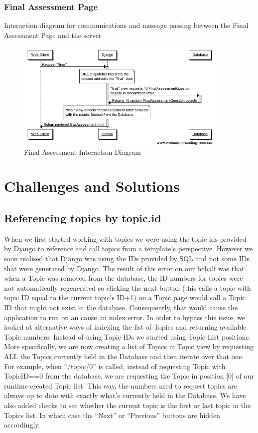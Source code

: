 \documentclass{l3proj}
\begin{document}
\subsubsection{Final Assessment Page}
Interaction diagram for communications and message passing between the Final Assessment Page and the server
\begin{figure}[!htb]
\caption{Final Assessment Interaction Diagram}
 \centering
\includegraphics[width=0.9\textwidth]{images/finalAssessmentInteractionDiagram.png}
\end{figure}
\section{Challenges and Solutions}
\subsection{Referencing topics by topic.id}
When we first started working with topics we were using the topic ids
provided by Django to reference and call topics from a template's
perspective. However we soon realised that Django was using the IDs
provided by SQL and not some IDs that were generated by Django. The
result of this error on our behalf was that when a Topic was removed
from the database, the ID numbers for topics were not automatically
regenerated so clicking the next button (this calls a topic with topic
ID equal to the current topic's ID+1) on a Topic page would call a
Topic ID that might not exist in the database. Consequently, that
would cause the application to run on an cause an index error. In order to bypass this issue, we looked at alternative ways of indexing the list of Topics and returning available Topic numbers.  Instead of using Topic IDs we started using Topic List positions. More specifically, we are now creating a list of Topics in Topic view by requesting ALL the Topics currently held in the Database and then iterate over that one. For example, when “/topic/0” is called, instead of requesting Topic with TopicID==0 from the database, we are requesting the Topic in position [0] of our runtime created Topic list. This way, the numbers used to request topics are always up to date with exactly what's currently held in the Database.  We have also added checks to see whether the current topic is the first or last topic in the Topics list. In which case the “Next” or “Previous” buttons are hidden accordingly.
\end{document}
